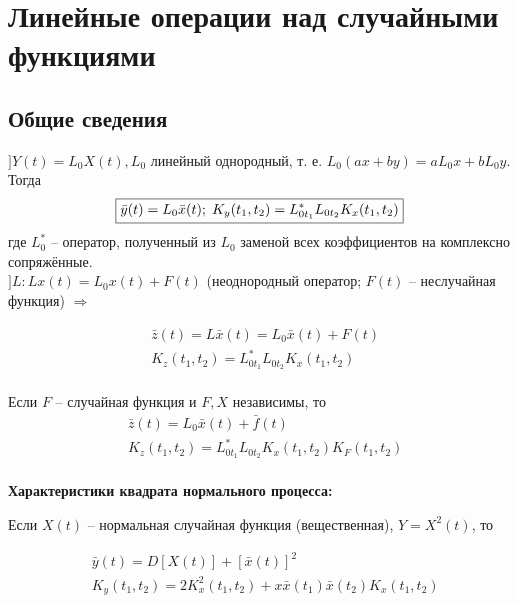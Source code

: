 \documentclass[a4paper,11pt, twocolumn]{article}
\begin{document}
\section{Линейные операции над случайными функциями}

\subsection{ Общие сведения }

$ ] Y(t) = L_0 X(t), L_0 $ линейный однородный, т. е. $ L_0(ax + by) = a L_0 x + b L_0 y $.  Тогда
$$ \boxed{ \bar y(t) = L_0 \bar x(t); \thickspace K_y(t_1, t_2) = L_{0t_1}^* L_{0t_2} K_x(t_1, t_2) } $$
где $ L_0^* $ -- оператор, полученный из $ L_0 $ заменой всех коэффициентов на комплексно сопряжённые. \\

$ ] L : Lx(t) = L_0 x(t) + F(t) $ (неоднородный оператор; $ F(t) $ -- неслучайная функция) $ \Rightarrow $

\begin{mdframed}[linewidth=1]
    \begin{align*}
        & \bar z(t) = L \bar x(t) = L_0 \bar x(t) + F(t) \\
        & K_z(t_1, t_2) = L_{0t_1}^* L_{0t_2} K_x(t_1, t_2) \\
    \end{align*}
\end{mdframed}
Если $ F $ -- случайная функция и $ F, X $ независимы, то
\begin{align*}
    & \bar z(t) = L_0 \bar x(t) + \bar f(t) \\
    & K_z(t_1, t_2) = L_{0t_1}^* L_{0t_2} K_x(t_1, t_2) K_F(t_1, t_2) \\ %
\end{align*}


\textbf{Характеристики квадрата нормального процесса:}

Если $ X(t) $ -- нормальная случайная функция (вещественная), $ Y = X^2(t) $, то

\begin{mdframed}[linewidth=1]
    \begin{align*}
        & \bar y(t) = D[X(t)] + [\bar x(t)]^2 \\
        & K_y (t_1, t_2) = 2 K_x^2(t_1, t_2) + x \bar x(t_1) \bar x(t_2) K_x(t_1, t_2)
    \end{align*}
\end{mdframed}
\end{document}
